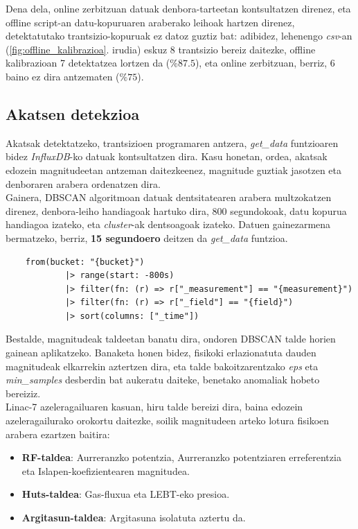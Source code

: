 \documentclass[12pt]{article}
\numberwithin{figure}{section}
\numberwithin{equation}{section}
\begin{document}
Dena dela, online zerbitzuan datuak denbora-tarteetan kontsultatzen direnez, eta offline script-an datu-kopuruaren araberako leihoak hartzen direnez, detektatutako trantsizio-kopuruak ez datoz guztiz bat: adibidez, lehenengo \textit{csv}-an (\ref{fig:offline_kalibrazioa}. irudia) eskuz 8 trantsizio bereiz daitezke, offline kalibrazioan 7 detektatzea lortzen da ($\% 87.5$), eta online zerbitzuan, berriz, 6 baino ez dira antzematen ($\%75$).

\subsection{Akatsen detekzioa}
Akatsak detektatzeko, trantsizioen programaren antzera, \textit{get\_data} funtzioaren bidez \textit{InfluxDB}-ko datuak kontsultatzen dira. Kasu honetan, ordea, akatsak edozein magnitudeetan antzeman daitezkeenez, magnitude guztiak jasotzen eta denboraren arabera ordenatzen dira.\\

Gainera, DBSCAN algoritmoan datuak dentsitatearen arabera multzokatzen direnez, denbora-leiho handiagoak hartuko dira, 800 segundokoak, datu kopurua handiagoa izateko, eta \textit{cluster}-ak dentsoagoak izateko. Datuen gainezarmena bermatzeko, berriz, \textbf{15 segundoero} deitzen da \textit{get\_data} funtzioa.

\begin{verbatim}
    from(bucket: "{bucket}")
            |> range(start: -800s)
            |> filter(fn: (r) => r["_measurement"] == "{measurement}")
            |> filter(fn: (r) => r["_field"] == "{field}")
            |> sort(columns: ["_time"])
\end{verbatim}

Bestalde, magnitudeak taldeetan banatu dira, ondoren DBSCAN talde horien gainean aplikatzeko. Banaketa honen bidez, fisikoki erlazionatuta dauden magnitudeak elkarrekin aztertzen dira, eta talde bakoitzarentzako \textit{eps} eta \textit{min\_samples} desberdin bat aukeratu daiteke, benetako anomaliak hobeto bereiziz.\\

Linac-7 azeleragailuaren kasuan, hiru talde bereizi dira, baina edozein azeleragailurako orokortu daitezke, soilik magnitudeen arteko lotura fisikoen arabera ezartzen baitira:

\begin{itemize}
    \item \textbf{RF-taldea}: Aurreranzko potentzia, Aurreranzko potentziaren erreferentzia eta Islapen-koefizientearen magnitudea.
    \item \textbf{Huts-taldea}: Gas-fluxua eta LEBT-eko presioa.
    \item \textbf{Argitasun-taldea}: Argitasuna isolatuta aztertu da.
\end{itemize}
\end{document}
